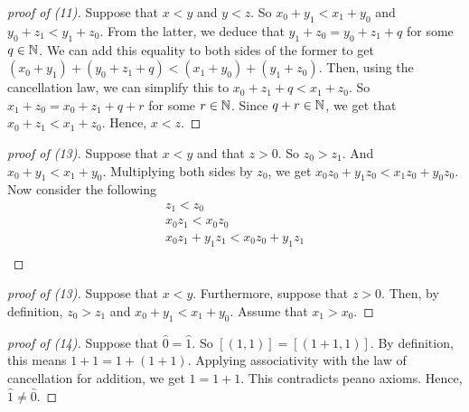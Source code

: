 \begin{proof}[proof of (11)]
    Suppose that \(x < y\) and \(y < z\). So \(x_0 + y_1 < x_1 + y_0\) and \(y_0 + z_1 < y_1 + z_0\). From the latter, we deduce that \(y_1 + z_0 = y_0 + z_1 + q\) for some \(q \in \mathbb{N}\).
    We can add this equality to both sides of the former to get \((x_0 + y_1) + (y_0 + z_1 + q) < (x_1 + y_0) + (y_1 + z_0)\). Then, using the cancellation law, we can simplify this to
    \(x_0 + z_1 + q < x_1 + z_0\). So \(x_1 + z_0 = x_0 + z_1 + q + r\) for some \(r \in \mathbb{N}\). Since \(q+r \in \mathbb{N}\), we get that \(x_0 + z_1 < x_1 + z_0\). Hence, \(x < z\).
\end{proof}
\begin{proof}[proof of (13)]
    Suppose that \(x < y\) and that \(z > 0\). So \(z_0 > z_1\). And \(x_0 + y_1 < x_1 + y_0\). Multiplying both sides by \(z_0\), we get \(x_0 z_0 + y_1 z_0 < x_1 z_0 + y_0 z_0\).
    Now consider the following
    \begin{gather*}
        z_1 < z_0\\
        x_0 z_1 < x_0 z_0 \\
        x_0 z_1 + y_1 z_1 < x_0 z_0 + y_1 z_1 \\
    \end{gather*}
\end{proof}
\begin{proof}[proof of (13)]
    Suppose that \(x < y\). Furthermore, suppose that \(z > 0\). Then, by definition, \(z_0 > z_1\) and \(x_0 + y_1 < x_1 + y_0\).
    Assume that \(x_1 > x_0\).
\end{proof}
\begin{proof}[proof of (14)]
    Suppose that \(\hat{0} = \hat{1}\). So \([(1,1)] = [(1+1, 1)]\). By definition, this means \(1 + 1 = 1 + (1+1)\). Applying associativity with the law of cancellation for addition, we get \(1 = 1+ 1\). This contradicts peano axioms. Hence, \(\hat{1} \neq \hat{0}\).
\end{proof}